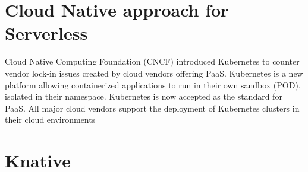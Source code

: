 \documentclass{article}
\begin{document}
\section{Cloud Native approach for Serverless}
\begin{flushleft}
Cloud Native Computing Foundation (CNCF) introduced Kubernetes to counter vendor lock-in issues created by cloud vendors offering PaaS. Kubernetes is a new platform allowing containerized applications to run in their own sandbox (POD), isolated in their namespace.
Kubernetes is now accepted as the standard for PaaS. All major cloud vendors support the deployment of Kubernetes clusters in their cloud environments
\end{flushleft}
\section{Knative }
\end{document}
